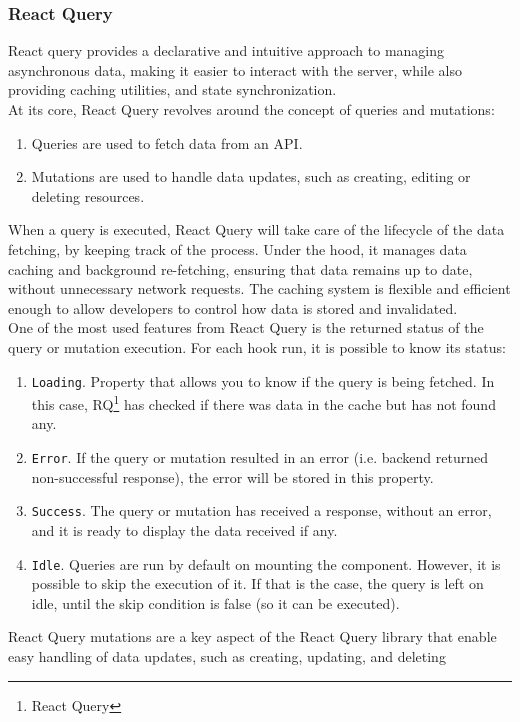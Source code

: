 \documentclass[./memory.tex]{subfiles}
\begin{document}
\subsubsection{React Query}
React query provides a declarative and intuitive approach to managing
asynchronous data, making it easier to interact with the server, while also
providing caching utilities, and state synchronization.
\\[8pt]
At its core, React Query revolves around the concept of queries and mutations:
\begin{enumerate}[label = -]
	\item Queries are used to fetch data from an API.
	\item Mutations are used to handle data updates, such as creating, editing
	      or deleting resources.
\end{enumerate}
When a query is executed, React Query will take care of the lifecycle of the
data fetching, by keeping track of the process. Under the hood, it manages data
caching and background re-fetching, ensuring that data remains up to date,
without unnecessary network requests. The caching system is flexible and
efficient enough to allow developers to control how data is stored and
invalidated.
\\
One of the most used features from React Query is the returned status of the
query or mutation execution. For each hook run, it is possible to know its
status:
\begin{enumerate}[label = -]
	\item\texttt{Loading}. Property that allows you to know if the query is
	being fetched. In this case, RQ\footnote{React Query} has checked if there
	was data in the cache but has not found any.
	\item\texttt{Error}. If the query or mutation resulted in an error (i.e.
	backend returned non-successful response), the error will be stored in this
	property.
	\item\texttt{Success}. The query or mutation has received a response, without
	an error, and it is ready to display the data received if any.
	\item\texttt{Idle}. Queries are run by default on mounting the component.
	However, it is possible to skip the execution of it. If that is the case,
	the query is left on idle, until the skip condition is false (so it can be
	executed).
\end{enumerate}
React Query mutations are a key aspect of the React Query library that enable
easy handling of data updates, such as creating, updating, and deleting
\end{document}
